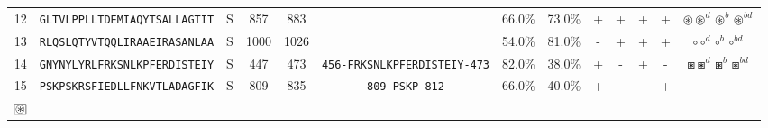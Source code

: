 \begin{tabular}{rcccccccccccc}
12 &  \texttt{GLTVLPPLLTDEMIAQYTSALLAGTIT} &       S &    857 &   883 &                                                                  &                          66.0\% &                           73.0\% &          + &           + &          + &           + &                                                                                   $ \circledast \circledast^d \circledast^b \circledast^{bd} $ \\
13 &  \texttt{RLQSLQTYVTQQLIRAAEIRASANLAA} &       S &   1000 &  1026 &                                                                  &                          54.0\% &                           81.0\% &          - &           + &          + &           + &                                                                                                           $ \circ \circ^d \circ^b \circ^{bd} $ \\
14 &  \texttt{GNYNYLYRLFRKSNLKPFERDISTEIY} &       S &    447 &   473 &  \texttt{{\scriptsize 456-}FRKSNLKPFERDISTEIY{\scriptsize -473}} &                          82.0\% &                           38.0\% &          + &           - &          + &           - &                                                                                                   $ \boxast \boxast^d \boxast^b \boxast^{bd} $ \\
15 &  \texttt{PSKPSKRSFIEDLLFNKVTLADAGFIK} &       S &    809 &   835 &                \texttt{{\scriptsize 809-}PSKP{\scriptsize -812}} &                          66.0\% &                           40.0\% &          + &           - &          - &           + &                             \Centerstack{  $\boxast \boxast^b \boxcircle \boxcircle^d$ \\  $\setlength{\fboxsep}{0.5pt} \boxed{\circledast}$ } \\
\bottomrule
\end{tabular}
